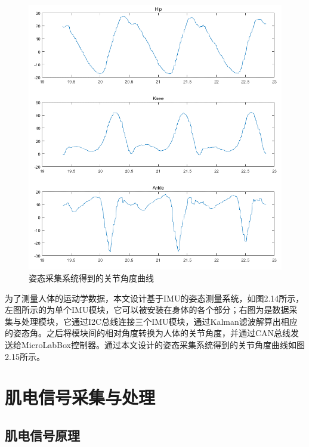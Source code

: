 \begin{figure}[!h]
    \includegraphics[width=13.5cm]{fig/f39.png}
    \caption{姿态采集系统得到的关节角度曲线}
    \label{fig:mark}
\end{figure}

为了测量人体的运动学数据，本文设计基于IMU的姿态测量系统，如图2.14所示，左图所示的为单个IMU模块，它可以被安装在身体的各个部分；右图为是数据采集与处理模块，它通过I2C总线连接三个IMU模块，通过Kalman滤波解算出相应的姿态角。之后将模块间的相对角度转换为人体的关节角度，并通过CAN总线发送给MicroLabBox控制器。通过本文设计的姿态采集系统得到的关节角度曲线如图2.15所示。

\section{肌电信号采集与处理}
\subsection{肌电信号原理}

